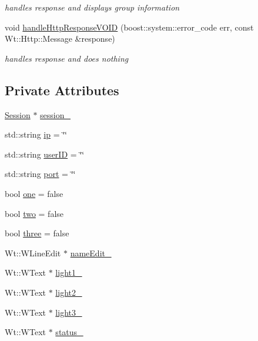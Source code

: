 \begin{DoxyCompactItemize}
\begin{DoxyCompactList}\small\item\em handles response and displays group information \end{DoxyCompactList}\item 
void \hyperlink{class_groups_control_widget_ade80d514e591c307c4cc6c0fbb758896}{handle\+Http\+Response\+V\+O\+ID} (boost\+::system\+::error\+\_\+code err, const Wt\+::\+Http\+::\+Message \&response)
\begin{DoxyCompactList}\small\item\em handles response and does nothing \end{DoxyCompactList}\end{DoxyCompactItemize}
\subsection*{Private Attributes}
\begin{DoxyCompactItemize}
\item 
\hyperlink{class_session}{Session} $\ast$ \hyperlink{class_groups_control_widget_a22dc704f954395ff53d67c51dbec933f}{session\+\_\+}
\item 
std\+::string \hyperlink{class_groups_control_widget_abf7a784bfb01b064e2bb2064c8e3e3a3}{ip} = \char`\"{}\char`\"{}
\item 
std\+::string \hyperlink{class_groups_control_widget_a5254fd01a7e3c5d56515d1161f392b09}{user\+ID} = \char`\"{}\char`\"{}
\item 
std\+::string \hyperlink{class_groups_control_widget_aad63d0d29a731819e47f1cd2974511ed}{port} = \char`\"{}\char`\"{}
\item 
bool \hyperlink{class_groups_control_widget_a83ab8b39f8c267cc46ad79b38e648618}{one} = false
\item 
bool \hyperlink{class_groups_control_widget_a4d0f1619ed1d0976fc48ea38262a5e5c}{two} = false
\item 
bool \hyperlink{class_groups_control_widget_a441299ffc41342f9c91d3d6f319732ed}{three} = false
\item 
Wt\+::\+W\+Line\+Edit $\ast$ \hyperlink{class_groups_control_widget_aecb5c19707326e3ec3c5b140da32e62d}{name\+Edit\+\_\+}
\item 
Wt\+::\+W\+Text $\ast$ \hyperlink{class_groups_control_widget_a66968632cf6001c9aeb5e227d9d06177}{light1\+\_\+}
\item 
Wt\+::\+W\+Text $\ast$ \hyperlink{class_groups_control_widget_aadce8705e32e8559e28feb2cfdae23e8}{light2\+\_\+}
\item 
Wt\+::\+W\+Text $\ast$ \hyperlink{class_groups_control_widget_a9846da1c58d8430074935daeea6b385b}{light3\+\_\+}
\item 
Wt\+::\+W\+Text $\ast$ \hyperlink{class_groups_control_widget_aa20f4ee341f245754611fa4494b38ecd}{status\+\_\+}
\end{DoxyCompactItemize}


